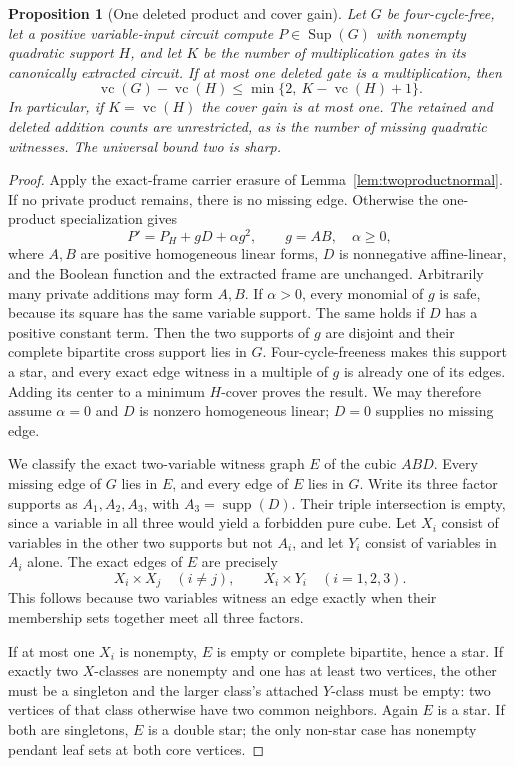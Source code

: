 \documentclass[11pt]{article}
\newcommand{\supp}{\operatorname{supp}}
\newcommand{\Sup}{\operatorname{Sup}}
\newcommand{\vc}{\operatorname{vc}}
\newtheorem{proposition}[theorem]{Proposition}
\theoremstyle{definition}
\theoremstyle{remark}
\begin{document}
\begin{proposition}[One deleted product and cover gain]\label{prop:oneproductcover}
Let $G$ be four-cycle-free, let a positive variable-input circuit compute $P\in\Sup(G)$ with nonempty quadratic support $H$, and let $K$ be the number of multiplication gates in its canonically extracted circuit. If at most one deleted gate is a multiplication, then
\[
 \vc(G)-\vc(H)\le\min\{2,\ K-\vc(H)+1\}.
\]
In particular, if $K=\vc(H)$ the cover gain is at most one. The retained and deleted addition counts are unrestricted, as is the number of missing quadratic witnesses. The universal bound two is sharp.
\end{proposition}
\begin{proof}
Apply the exact-frame carrier erasure of Lemma~\ref{lem:twoproductnormal}. If no private product remains, there is no missing edge. Otherwise the one-product specialization gives
\[
 P'=P_H+gD+\alpha g^2,\qquad g=AB,\quad \alpha\ge0,
\]
where $A,B$ are positive homogeneous linear forms, $D$ is nonnegative affine-linear, and the Boolean function and the extracted frame are unchanged. Arbitrarily many private additions may form $A,B$. If $\alpha>0$, every monomial of $g$ is safe, because its square has the same variable support. The same holds if $D$ has a positive constant term. Then the two supports of $g$ are disjoint and their complete bipartite cross support lies in $G$. Four-cycle-freeness makes this support a star, and every exact edge witness in a multiple of $g$ is already one of its edges. Adding its center to a minimum $H$-cover proves the result. We may therefore assume $\alpha=0$ and $D$ is nonzero homogeneous linear; $D=0$ supplies no missing edge.

We classify the exact two-variable witness graph $E$ of the cubic $ABD$. Every missing edge of $G$ lies in $E$, and every edge of $E$ lies in $G$. Write its three factor supports as $A_1,A_2,A_3$, with $A_3=\supp(D)$. Their triple intersection is empty, since a variable in all three would yield a forbidden pure cube. Let $X_i$ consist of variables in the other two supports but not $A_i$, and let $Y_i$ consist of variables in $A_i$ alone. The exact edges of $E$ are precisely
\[
 X_i\times X_j\quad(i\ne j),\qquad X_i\times Y_i\quad(i=1,2,3).
\]
This follows because two variables witness an edge exactly when their membership sets together meet all three factors.

If at most one $X_i$ is nonempty, $E$ is empty or complete bipartite, hence a star. If exactly two $X$-classes are nonempty and one has at least two vertices, the other must be a singleton and the larger class's attached $Y$-class must be empty: two vertices of that class otherwise have two common neighbors. Again $E$ is a star. If both are singletons, $E$ is a double star; the only non-star case has nonempty pendant leaf sets at both core vertices.


\end{proof}
\end{document}
